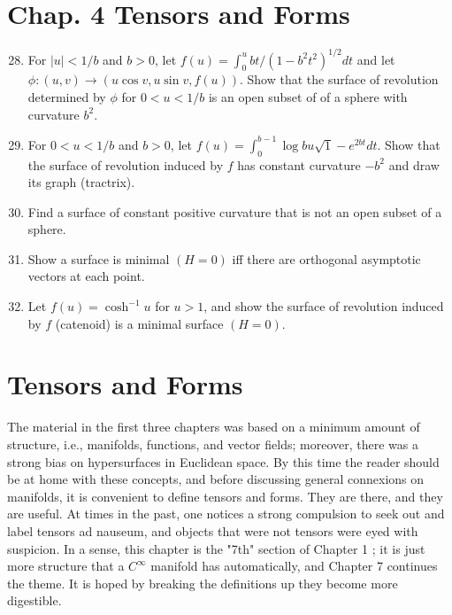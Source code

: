 \documentclass[10pt]{article}
\begin{document}
\section{Chap. 4 Tensors and Forms}
\begin{enumerate}
  \setcounter{enumi}{27}
  \item For $|u|<1 / b$ and $b>0$, let $f(u)=\int_{0}^{u} b t /\left(1-b^{2} t^{2}\right)^{1 / 2} d t$ and let $\phi:(u, v) \rightarrow(u \cos v, u \sin v, f(u))$. Show that the surface of revolution determined by $\phi$ for $0<u<1 / b$ is an open subset of of a sphere with curvature $b^{2}$.

  \item For $0<u<1 / b$ and $b>0$, let $f(u)=\int_{0}^{b-1} \log b u \sqrt{1}-e^{2 b t} d t$. Show that the surface of revolution induced by $f$ has constant curvature $-b^{2}$ and draw its graph (tractrix).

  \item Find a surface of constant positive curvature that is not an open subset of a sphere.

  \item Show a surface is minimal $(H=0)$ iff there are orthogonal asymptotic vectors at each point.

  \item Let $f(u)=\cosh ^{-1} u$ for $u>1$, and show the surface of revolution induced by $f$ (catenoid) is a minimal surface $(H=0)$.

\end{enumerate}
\section{Tensors and Forms}
The material in the first three chapters was based on a minimum amount of structure, i.e., manifolds, functions, and vector fields; moreover, there was a strong bias on hypersurfaces in Euclidean space. By this time the reader should be at home with these concepts, and before discussing general connexions on manifolds, it is convenient to define tensors and forms. They are there, and they are useful. At times in the past, one notices a strong compulsion to seek out and label tensors ad nauseum, and objects that were not tensors were eyed with suspicion. In a sense, this chapter is the "7th" section of Chapter 1 ; it is just more structure that a $C^{\infty}$ manifold has automatically, and Chapter 7 continues the theme. It is hoped by breaking the definitions up they become more digestible.
\end{document}
